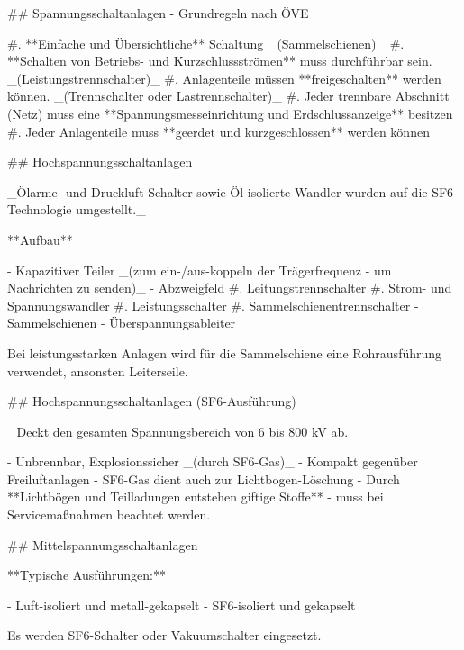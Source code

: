 \newpage

\begin{markdown}

## Spannungsschaltanlagen - Grundregeln nach ÖVE

#. **Einfache und Übersichtliche** Schaltung _(Sammelschienen)_
#. **Schalten von Betriebs- und Kurzschlussströmen** muss durchführbar sein. _(Leistungstrennschalter)_
#. Anlagenteile müssen **freigeschalten** werden können. _(Trennschalter oder Lastrennschalter)_
#. Jeder trennbare Abschnitt (Netz) muss eine **Spannungsmesseinrichtung und Erdschlussanzeige** besitzen
#. Jeder Anlagenteile muss **geerdet und kurzgeschlossen** werden können

## Hochspannungsschaltanlagen

_Ölarme- und Druckluft-Schalter sowie Öl-isolierte Wandler wurden auf die SF6-Technologie umgestellt._

**Aufbau**

- Kapazitiver Teiler _(zum ein-/aus-koppeln der Trägerfrequenz - um Nachrichten zu senden)_
- Abzweigfeld
    #. Leitungstrennschalter
    #. Strom- und Spannungswandler
    #. Leistungsschalter
    #. Sammelschienentrennschalter
- Sammelschienen
- Überspannungsableiter

Bei leistungsstarken Anlagen wird für die Sammelschiene eine Rohrausführung verwendet, ansonsten Leiterseile.

## Hochspannungsschaltanlagen (SF6-Ausführung)


_Deckt den gesamten Spannungsbereich von 6 bis 800 kV ab._

- Unbrennbar, Explosionssicher _(durch SF6-Gas)_
- Kompakt gegenüber Freiluftanlagen
- SF6-Gas dient auch zur Lichtbogen-Löschung
- Durch **Lichtbögen und Teilladungen entstehen giftige Stoffe** - muss bei Servicemaßnahmen beachtet werden.

## Mittelspannungsschaltanlagen

**Typische Ausführungen:**

- Luft-isoliert und metall-gekapselt
- SF6-isoliert und gekapselt

Es werden SF6-Schalter oder Vakuumschalter eingesetzt.

\end{markdown}